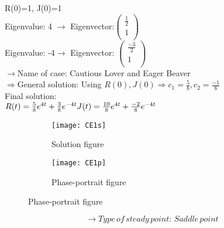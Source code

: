 \documentclass[a4paper]{article}
\begin{document}
R(0)=1, J(0)=1\\
Eigenvalue: 4 $\to$ Eigenvector:$\left( \begin{matrix}
  \frac{1}{2} \\ 
  1 \\ 
\end{matrix} \right)$ \\
Eigenvalue: -4$\to$ Eigenvector: $\left( \begin{matrix}
  \frac{-3}{2} \\ 
  1 \\ 
\end{matrix} \right)$\\
$\to$Name of case: Cautious Lover and Eager Beaver\\
$\Rightarrow$General solution:
Using $R(0),J(0)\Rightarrow {{c}_{1}}=\frac{5}{8},{{c}_{2}}=\frac{-1}{8}$\\
Final solution:\\
\begin{math}
R(t)=\frac{5}{8}{{e}^{4t}}+\frac{3}{8}{{e}^{-4t}}\\
J(t)=\frac{10}{8}{{e}^{4t}}+\frac{-2}{8}{{e}^{-4t}}
\end{math}
\begin{figure}[H]
\centering
\begin{subfigure}{.5\textwidth}
  \centering
  \texttt{[image: CE1s]}
  \caption*{Solution figure}
\end{subfigure}%
\begin{subfigure}{.5\textwidth}
  \centering
  \texttt{[image: CE1p]}
  \caption*{Phase-portrait figure}
\end{subfigure}
\end{figure}
\[  \to  Type\,of\,steady\,point:\,Saddle\,point\]
\end{document}
